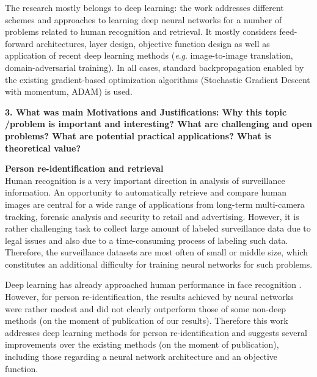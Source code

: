 \documentclass[a4paper, 11pt, oneside]{Thesis}  %
\newcommand{\eg}{\textit{e}.\textit{g}.}
\begin{document}
The research mostly belongs to deep learning: the work addresses different schemes and approaches to learning deep neural networks for a number of problems related to human recognition and retrieval. It mostly considers feed-forward architectures, layer design, objective function design as well as application of recent deep learning methods (\eg{} image-to-image translation, domain-adversarial training). In all cases, standard backpropagation enabled by the existing gradient-based optimization algorithms (Stochastic Gradient Descent with momentum, ADAM) is used.

\bigskip\ident\textbf{
3. What was main Motivations and Justifications: Why this topic /problem is important and interesting?
What are challenging and open problems? What are potential practical applications?
What is theoretical value?}


\textbf{Person re-identification and retrieval}\\
Human recognition is a very important direction in analysis of surveillance information. An opportunity to automatically retrieve and compare human images are central for a wide range of applications from long-term multi-camera tracking, forensic analysis and security to retail and advertising. However, it is rather challenging task to collect large amount of labeled surveillance data due to legal issues and also due to a time-consuming process of labeling such data. Therefore, the surveillance datasets are most often of small or middle size, which constitutes an additional difficulty for training neural networks for such problems.

Deep learning has already approached human performance in face recognition \citep{Taigman14,SchroffKP15,parkhi2015deep}. However, for person re-identification, the results achieved by neural networks were rather modest \citep{ahmed2015improved,Li14} and did not clearly outperform those of some non-deep methods \citep{paisitkriangkrai2015learning} (on the moment of publication of our results). Therefore this work addresses deep learning methods for person re-identification and suggests several improvements over the existing methods (on the moment of publication), including those regarding a neural network architecture and an objective function. %
\end{document}
